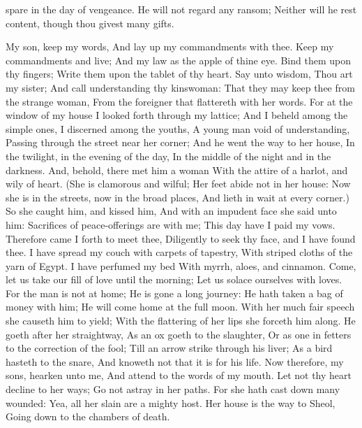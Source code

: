spare in the day of vengeance.  He will not regard any ransom; Neither will he rest content, though thou givest many gifts. 

My son, keep my words, And lay up my commandments with thee.  Keep my commandments and live; And my law as the apple of thine eye.  Bind them upon thy fingers; Write them upon the tablet of thy heart.  Say unto wisdom, Thou art my sister; And call understanding thy kinswoman:  That they may keep thee from the strange woman, From the foreigner that flattereth with her words.  For at the window of my house I looked forth through my lattice;  And I beheld among the simple ones, I discerned among the youths, A young man void of understanding,  Passing through the street near her corner; And he went the way to her house,  In the twilight, in the evening of the day, In the middle of the night and in the darkness.  And, behold, there met him a woman With the attire of a harlot, and wily of heart.  (She is clamorous and wilful; Her feet abide not in her house:  Now she is in the streets, now in the broad places, And lieth in wait at every corner.)  So she caught him, and kissed him, And with an impudent face she said unto him:  Sacrifices of peace-offerings are with me; This day have I paid my vows.  Therefore came I forth to meet thee, Diligently to seek thy face, and I have found thee.  I have spread my couch with carpets of tapestry, With striped cloths of the yarn of Egypt.  I have perfumed my bed With myrrh, aloes, and cinnamon.  Come, let us take our fill of love until the morning; Let us solace ourselves with loves.  For the man is not at home; He is gone a long journey:  He hath taken a bag of money with him; He will come home at the full moon.  With her much fair speech she causeth him to yield; With the flattering of her lips she forceth him along.  He goeth after her straightway, As an ox goeth to the slaughter, Or as one in fetters to the correction of the fool;  Till an arrow strike through his liver; As a bird hasteth to the snare, And knoweth not that it is for his life.  Now therefore, my sons, hearken unto me, And attend to the words of my mouth.  Let not thy heart decline to her ways; Go not astray in her paths.  For she hath cast down many wounded: Yea, all her slain are a mighty host.  Her house is the way to Sheol, Going down to the chambers of death. 

